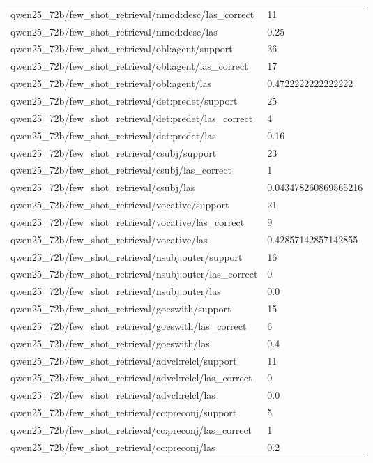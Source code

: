 \begin{tabular}{ll}
qwen25\_72b/few\_shot\_retrieval/nmod:desc/las\_correct & 11 \\
qwen25\_72b/few\_shot\_retrieval/nmod:desc/las & 0.25 \\
qwen25\_72b/few\_shot\_retrieval/obl:agent/support & 36 \\
qwen25\_72b/few\_shot\_retrieval/obl:agent/las\_correct & 17 \\
qwen25\_72b/few\_shot\_retrieval/obl:agent/las & 0.4722222222222222 \\
qwen25\_72b/few\_shot\_retrieval/det:predet/support & 25 \\
qwen25\_72b/few\_shot\_retrieval/det:predet/las\_correct & 4 \\
qwen25\_72b/few\_shot\_retrieval/det:predet/las & 0.16 \\
qwen25\_72b/few\_shot\_retrieval/csubj/support & 23 \\
qwen25\_72b/few\_shot\_retrieval/csubj/las\_correct & 1 \\
qwen25\_72b/few\_shot\_retrieval/csubj/las & 0.043478260869565216 \\
qwen25\_72b/few\_shot\_retrieval/vocative/support & 21 \\
qwen25\_72b/few\_shot\_retrieval/vocative/las\_correct & 9 \\
qwen25\_72b/few\_shot\_retrieval/vocative/las & 0.42857142857142855 \\
qwen25\_72b/few\_shot\_retrieval/nsubj:outer/support & 16 \\
qwen25\_72b/few\_shot\_retrieval/nsubj:outer/las\_correct & 0 \\
qwen25\_72b/few\_shot\_retrieval/nsubj:outer/las & 0.0 \\
qwen25\_72b/few\_shot\_retrieval/goeswith/support & 15 \\
qwen25\_72b/few\_shot\_retrieval/goeswith/las\_correct & 6 \\
qwen25\_72b/few\_shot\_retrieval/goeswith/las & 0.4 \\
qwen25\_72b/few\_shot\_retrieval/advcl:relcl/support & 11 \\
qwen25\_72b/few\_shot\_retrieval/advcl:relcl/las\_correct & 0 \\
qwen25\_72b/few\_shot\_retrieval/advcl:relcl/las & 0.0 \\
qwen25\_72b/few\_shot\_retrieval/cc:preconj/support & 5 \\
qwen25\_72b/few\_shot\_retrieval/cc:preconj/las\_correct & 1 \\
qwen25\_72b/few\_shot\_retrieval/cc:preconj/las & 0.2 \\

\end{tabular}
